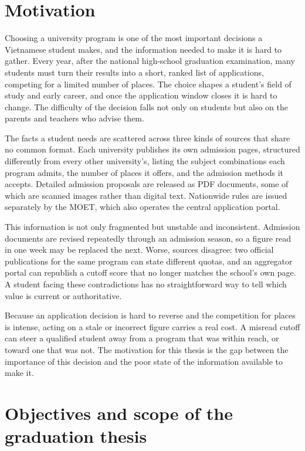 \documentclass[../main.tex]{subfiles}
\begin{document}

\section{Motivation}
\label{section:1.1}

Choosing a university program is one of the most important decisions a Vietnamese student makes, and the information needed to make it is hard to gather.
Every year, after the national high-school graduation examination, many students must turn their results into a short, ranked list of applications, competing for a limited number of places.
The choice shapes a student's field of study and early career, and once the application window closes it is hard to change.
The difficulty of the decision falls not only on students but also on the parents and teachers who advise them.

The facts a student needs are scattered across three kinds of sources that share no common format.
Each university publishes its own admission pages, structured differently from every other university's, listing the subject combinations each program admits, the number of places it offers, and the admission methods it accepts.
Detailed admission proposals are released as \gls{PDF} documents, some of which are scanned images rather than digital text.
Nationwide rules are issued separately by the \gls{MOET}, which also operates the central application portal.

This information is not only fragmented but unstable and inconsistent.
Admission documents are revised repeatedly through an admission season, so a figure read in one week may be replaced the next.
Worse, sources disagree: two official publications for the same program can state different quotas, and an aggregator portal can republish a cutoff score that no longer matches the school's own page.
A student facing these contradictions has no straightforward way to tell which value is current or authoritative.

Because an application decision is hard to reverse and the competition for places is intense, acting on a stale or incorrect figure carries a real cost.
A misread cutoff can steer a qualified student away from a program that was within reach, or toward one that was not.
The motivation for this thesis is the gap between the importance of this decision and the poor state of the information available to make it.

\section{Objectives and scope of the graduation thesis}
\label{section:1.2}
\end{document}
